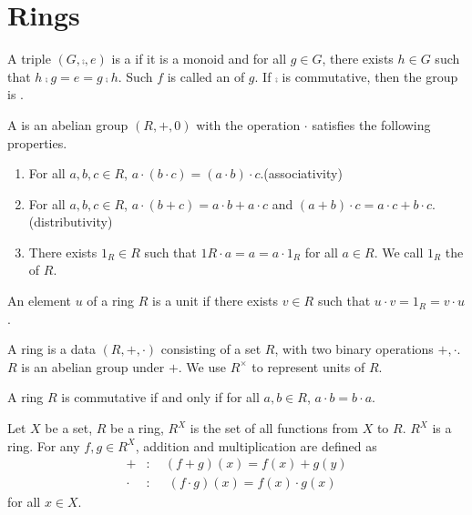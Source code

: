 \documentclass[10pt]{article}
\begin{document}
\section{Rings}
\begin{definition}
    A triple $(G,\comp,e)$ is a  if it is a monoid and for all $g\in G$, there exists $h\in G$ such that $h\comp g=e=g\comp h$. Such $f$ is called an  of $g$. If $\comp$ is commutative, then the group is . 
\end{definition}
\begin{hdefinition}
    A  is an abelian group $(R,+,0)$ with the operation $\cdot$ satisfies the following properties.
    \begin{enumerate}
        \item For all $a,b,c\in R$, $a\cdot(b\cdot c)=(a\cdot b)\cdot c$.\hfill(associativity)
        \item For all $a,b,c\in R$, $a\cdot(b+c)=a\cdot b+a\cdot c$ and $(a+b)\cdot c=a\cdot c+b\cdot c$.\hfill(distributivity)
        \item There exists ${1}_{R}\in R$ such that ${1}{R}\cdot a=a=a\cdot{1}_{R}$ for all $ a\in R$. We call ${1}_{R}$ the  of $R$.
    \end{enumerate}
\end{hdefinition}
\begin{hdefinition}[unit]
    An element $u$ of a ring $R$ is a unit if there exists $ v\in R$ such that $u\cdot v = 1_{R}=v\cdot u$.
\end{hdefinition}
\begin{remark}
    A ring is a data $(R, +, \cdot)$ consisting of a set $R$, with two binary operations $+,\cdot$. $R$ is an abelian group under $+$. We use $R^\times$ to represent units of $R$.
\end{remark}
\begin{hdefinition}
    A ring $R$ is commutative if and only if for all $ a,b\in R$, $a\cdot b=b\cdot a$.
\end{hdefinition}
\begin{example}
    Let $X$ be a set, $R$ be a ring, $R^{X}$ is the set of all functions from $X$ to $R$. $R^{X}$ is a ring. For any $f,g\in R^X$, addition and multiplication are defined as
    \begin{align*}
        +&:\quad (f+g)(x)=f(x)+g(y)\\
        \cdot&:\;\quad (f\cdot g)(x)=f(x)\cdot g(x)
    \end{align*}
    for all $x\in X$.
\end{example}
\end{document}
